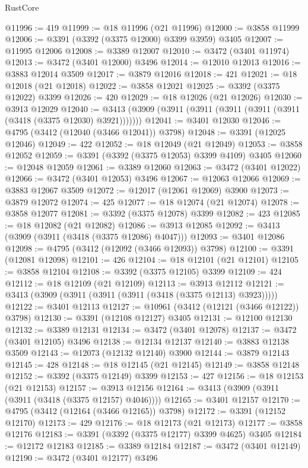 \begin{lexlean}{RustCore}
\begin{coremodule}
@11996 := 419
@11999 := @18 @11996 (@21 @11996)
@12000 := @3858 @11999
@12006 := @3391 (@3392 (@3375 @12000) @3399 @3959) @3405
@12007 := @11995 @12006
@12008 := @3389 @12007
@12010 := @3472 (@3401 @11974)
@12013 := @3472 (@3401 @12000) @3496
@12014 := @12010 @12013
@12016 := @3883 @12014 @3509
@12017 := @3879 @12016
@12018 := 421
@12021 := @18 @12018 (@21 @12018)
@12022 := @3858 @12021
@12025 := @3392 (@3375 @12022) @3399
@12026 := 420
@12029 := @18 @12026 (@21 @12026)
@12030 := @3913 @12029
@12040 := @3413 (@3909 (@3911 (@3911 (@3911 (@3911 (@3911 (@3418 (@3375 @12030) @3921)))))))
@12041 := @3401 @12030
@12046 := @4795 (@3412 (@12040 (@3466 @12041)) @3798)
@12048 := @3391 (@12025 @12046)
@12049 := 422
@12052 := @18 @12049 (@21 @12049)
@12053 := @3858 @12052
@12059 := @3391 (@3392 (@3375 @12053) @3399 @4109) @3405
@12060 := @12048 @12059
@12061 := @3389 @12060
@12063 := @3472 (@3401 @12022)
@12066 := @3472 (@3401 @12053) @3496
@12067 := @12063 @12066
@12069 := @3883 @12067 @3509
@12072 := @12017 (@12061 @12069) @3900
@12073 := @3879 @12072
@12074 := 425
@12077 := @18 @12074 (@21 @12074)
@12078 := @3858 @12077
@12081 := @3392 (@3375 @12078) @3399
@12082 := 423
@12085 := @18 @12082 (@21 @12082)
@12086 := @3913 @12085
@12092 := @3413 (@3909 (@3911 (@3418 (@3375 @12086) @4047)))
@12093 := @3401 @12086
@12098 := @4795 (@3412 (@12092 (@3466 @12093)) @3798)
@12100 := @3391 (@12081 @12098)
@12101 := 426
@12104 := @18 @12101 (@21 @12101)
@12105 := @3858 @12104
@12108 := @3392 (@3375 @12105) @3399
@12109 := 424
@12112 := @18 @12109 (@21 @12109)
@12113 := @3913 @12112
@12121 := @3413 (@3909 (@3911 (@3911 (@3911 (@3418 (@3375 @12113) @3923)))))
@12122 := @3401 @12113
@12127 := @10961 (@3412 (@12121 (@3466 @12122)) @3798)
@12130 := @3391 (@12108 @12127) @3405
@12131 := @12100 @12130
@12132 := @3389 @12131
@12134 := @3472 (@3401 @12078)
@12137 := @3472 (@3401 @12105) @3496
@12138 := @12134 @12137
@12140 := @3883 @12138 @3509
@12143 := @12073 (@12132 @12140) @3900
@12144 := @3879 @12143
@12145 := 428
@12148 := @18 @12145 (@21 @12145)
@12149 := @3858 @12148
@12152 := @3392 (@3375 @12149) @3399
@12153 := 427
@12156 := @18 @12153 (@21 @12153)
@12157 := @3913 @12156
@12164 := @3413 (@3909 (@3911 (@3911 (@3418 (@3375 @12157) @4046))))
@12165 := @3401 @12157
@12170 := @4795 (@3412 (@12164 (@3466 @12165)) @3798)
@12172 := @3391 (@12152 @12170)
@12173 := 429
@12176 := @18 @12173 (@21 @12173)
@12177 := @3858 @12176
@12183 := @3391 (@3392 (@3375 @12177) @3399 @4625) @3405
@12184 := @12172 @12183
@12185 := @3389 @12184
@12187 := @3472 (@3401 @12149)
@12190 := @3472 (@3401 @12177) @3496

\end{coremodule}
\end{lexlean}
